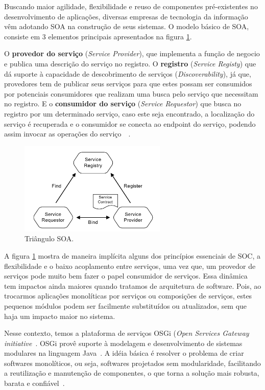 Buscando maior agilidade, flexibilidade e reuso de componentes pré-existentes no desenvolvimento de aplicações, diversas empresas de tecnologia da informação vêm adotando SOA na construção de seus sistemas. O modelo básico de SOA, consiste em 3 elementos principais apresentados na figura \ref{fig:soatriangle}.

O \textbf{provedor do serviço} (\textit{Service Provider}), que implementa a função de negocio e publica uma descrição do serviço no registro. O \textbf{registro} (\textit{Service Registy}) que dá suporte à capacidade de descobrimento de serviços (\textit{Discoverability}), já que, provedores tem de publicar seus serviços para que estes possam ser consumidos por potenciais consumidores que realizam uma busca pelo serviço que necessitam no registro. E o \textbf{consumidor do serviço} (\textit{Service Requestor}) que busca no registro por um determinado serviço, caso este seja encontrado, a localização do serviço é recuperada e o consumidor se conecta ao endpoint do serviço, podendo assim invocar as operações do serviço~\cite{michlmayr2007towards}~\cite{huhns2005service}.

\begin{figure}[htp]
\centering
\includegraphics[width=7cm]{chapters/intro/soa_triangle.png}
\caption[Triângulo SOA]{Triângulo SOA.}
\label{fig:soatriangle}
\end{figure}

A figura \ref{fig:soatriangle} mostra de maneira implícita alguns dos princípios essenciais de SOC, a flexibilidade e o baixo acoplamento entre serviços, uma vez que, um provedor de serviços pode muito bem fazer o papel consumidor de serviços. Essa dinâmica tem impactos ainda maiores quando tratamos de arquitetura de software. Pois, ao trocarmos aplicações monolíticas por serviços ou composições de serviços, estes pequenos módulos podem ser facilmente substituídos ou atualizados, sem que haja um impacto maior no sistema.

Nesse contexto, temos a plataforma de serviços OSGi (\textit{Open Services Gateway initiative}~\cite{alliance2007osgi}. OSGi provê suporte à modelagem e desenvolvimento de sistemas modulares na linguagem Java~\cite{hall2010osgi}. A idéia básica é resolver o problema de criar softwares monolíticos, ou seja, softwares projetados sem modularidade, facilitando a reutilização e manutenção de  componentes, o que torna a solução mais robusta, barata e confiável~\cite{davis2009open}.

